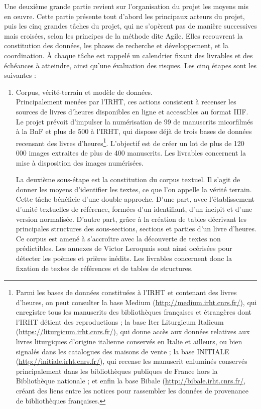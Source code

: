 \documentclass[a4paper,12pt,twoside]{book}
\begin{document}
	Une deuxième grande partie revient sur l'organisation du projet les moyens mis en œuvre. Cette partie présente tout d'abord les principaux acteurs du projet, puis les cinq grandes tâches du projet, qui ne s'opèrent pas de manière successives mais croisées, selon les principes de la méthode dite \og Agile\fg{}. Elles recouvrent la constitution des données, les phases de recherche et développement, et la coordination.  À chaque tâche est rappelé un calendrier fixant des livrables et des échéances à atteindre, ainsi qu'une évaluation des risques. Les cinq étapes sont les suivantes : 
	\begin{enumerate}
	    \item \og Corpus, vérité-terrain et modèle de données\fg{}. \\
	    
	    Principalement menées par l'IRHT, ces actions consistent à recenser les sources de livres d'heures disponibles en ligne et accessibles au format IIIF. Le projet prévoit d'impulser la numérisation de 99 de manuscrits micorfilmés à la BnF et plus de 500 à l'IRHT, qui dispose déjà de trois bases de données recensant des livres d'heures\footnote{Parmi les bases de données constituées à l'IRHT et contenant des livres d'heures, on peut consulter la base Medium (\url{http://medium.irht.cnrs.fr/}), qui enregistre tous les manuscrits des bibliothèques françaises et étrangères dont l’IRHT détient des reproductions ; la base Iter Liturgicum Italicum (\url{https://liturgicum.irht.cnrs.fr/}), qui donne accès aux données relatives aux livres liturgiques d’origine italienne conservés en Italie et ailleurs, ou bien signalés dans les catalogues des maisons de vente ; la base INITIALE (\url{http://initiale.irht.cnrs.fr/}), qui recense les manuscrit enluminés conservés principalement dans les bibliothèques publiques de France hors la Bibliothèque nationale ; et enfin la base Bibale (\url{http://bibale.irht.cnrs.fr/}, créant des liens entre les notices pour rassembler les données de provenance de bibliothèques françaises.}. L'objectif est de créer un lot de plus de 120 000 images extraites de plus de 400 manuscrits. Les livrables concernent la mise à disposition des images numérisées.
	    
	    La deuxième sous-étape est la constitution du corpus textuel. Il s'agit de donner les moyens d'identifier les textes, ce que l'on appelle la \og vérité terrain\fg{}. Cette tâche bénéficie d'une double approche. D'une part, avec l'établissement d'unité textuelles de référence, formées d'un identifiant, d'un incipit et d'une version normalisée. D'autre part, grâce à la création de tables décrivant les principales structures des sous-sections, sections et parties d'un livre d'heures. Ce corpus est amené à s'accroître  avec la découverte de textes non prédictibles. Les  annexes de Victor Leroquais sont ainsi océrisées pour détecter les poèmes et prières inédits. Les livrables concernent donc la fixation de textes de références et de tables de structures. 
	    

\end{enumerate}
\end{document}
